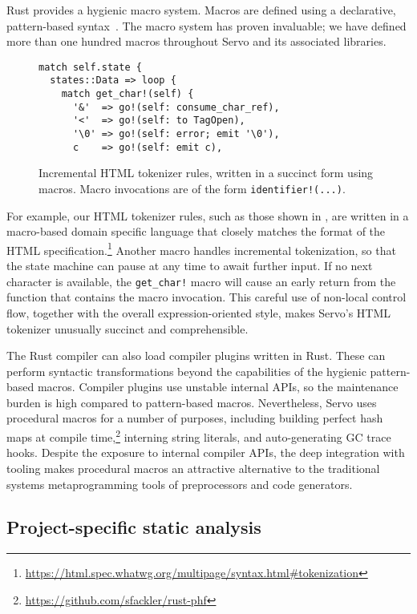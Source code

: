 Rust provides a hygienic macro system. Macros are defined using a declarative, pattern-based syntax~\cite{Kohlbecker:1987:MDS:41625.41632}. The macro system has proven invaluable; we have defined more than one hundred macros throughout Servo and its associated libraries.

\begin{figure}
\begin{lstlisting}
match self.state {
  states::Data => loop {
    match get_char!(self) {
      '&'  => go!(self: consume_char_ref),
      '<'  => go!(self: to TagOpen),
      '\0' => go!(self: error; emit '\0'),
      c    => go!(self: emit c),
\end{lstlisting}
  \caption{Incremental HTML tokenizer rules, written in a succinct form using macros. Macro invocations are of the form \lstinline{identifier!(...)}.}
  \label{fig:tokenizer-macros}
\end{figure}

For example, our HTML tokenizer rules, such as those shown in , are written in a macro-based domain specific language that closely matches the format of the HTML specification.\footnote{\url{https://html.spec.whatwg.org/multipage/syntax.html#tokenization}} Another macro handles incremental tokenization, so that the state machine can pause at any time to await further input. If no next character is available, the \lstinline{get_char!} macro will cause an early return from the function that contains the macro invocation. This careful use of non-local control flow, together with the overall expression-oriented style, makes Servo's HTML tokenizer unusually succinct and comprehensible.

The Rust compiler can also load compiler plugins written in Rust. These can perform syntactic transformations beyond the capabilities of the hygienic pattern-based macros. Compiler plugins use unstable internal APIs, so the maintenance burden is high compared to pattern-based macros. Nevertheless, Servo uses procedural macros for a number of purposes, including building perfect hash maps at compile time,\footnote{\url{https://github.com/sfackler/rust-phf}} interning string literals, and auto-generating GC trace hooks. Despite the exposure to internal compiler APIs, the deep integration with tooling makes procedural macros an attractive alternative to the traditional systems metaprogramming tools of preprocessors and code generators.

\subsection{Project-specific static analysis}


